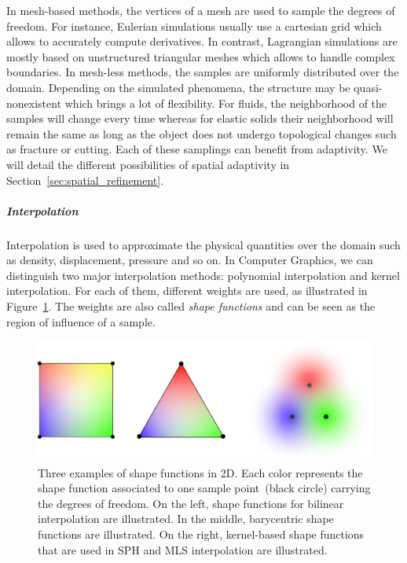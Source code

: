 In mesh-based methods, the vertices of a mesh are used to sample the degrees of freedom. For instance, Eulerian simulations usually use a cartesian grid which allows to accurately compute derivatives. 
In contrast, Lagrangian simulations are mostly based on unstructured triangular meshes which allows to handle complex boundaries.
In mesh-less methods, the samples are uniformly distributed over the domain. Depending on the simulated phenomena, the structure may be quasi-nonexistent which brings a lot of flexibility. For fluids, the neighborhood of the samples will change every time whereas for elastic solids their neighborhood will remain the same as long as the object does not undergo topological changes such as fracture or cutting.
Each of these samplings can benefit from adaptivity. We will detail the different possibilities of spatial adaptivity in Section~\ref{sec:spatial_refinement}.

\subparagraph{Interpolation}
Interpolation is used to approximate the physical quantities over the domain such as density, displacement, pressure and so on. 
In Computer Graphics, we can distinguish two major interpolation methods: polynomial interpolation and kernel interpolation.
For each of them, different weights are used, as illustrated in Figure~\ref{fig:shapefunction}. The weights are also called \emph{shape functions} and can be seen as the region of influence of a sample.
\begin{figure}[!h]
	\centering
	\includegraphics[width=\linewidth]{images/continuum_mechanics/shapefunction.png}
	\caption[STAR mechanics: Shape functions]{\label{fig:shapefunction} 
		Three examples of shape functions in 2D. 
		Each color represents the shape function associated to one sample point~(black circle) carrying the degrees of freedom. 
		On the left, shape functions for bilinear interpolation are illustrated. 
		In the middle, barycentric shape functions are illustrated. 
		On the right, kernel-based shape functions that are used in SPH and MLS interpolation are illustrated.}
\end{figure}

